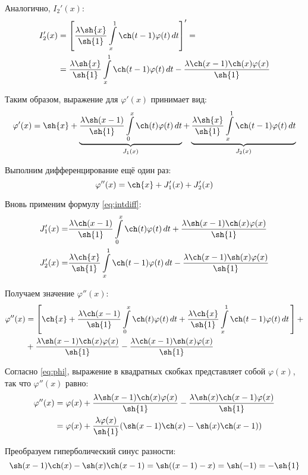 \documentclass{article}
\numberwithin{equation}{section}
\renewcommand{\phi}{\varphi}
\newcommand{\intl}{\int\limits}
\begin{document}
Аналогично, $I_2'(x)$:
\begin{align*}
  I_2'(x) &= \left[\frac{\lambda \sh{x}}{\sh{1}}\intl_x^1{\ch(t-1)\phi(t)\,dt} \right] ' = \\
  &= \frac{\lambda \sh{x}}{\sh{1}}\intl_x^1{\ch(t-1)\phi(t)\,dt} -
  \frac{\lambda \ch(x-1) \ch(x) \phi(x)}{\sh{1}}
\end{align*}

Таким образом, выражение для $\phi'(x)$ принимает вид:
\begin{equation}
  \label{eq:phidiff}
  \phi'(x) = \sh{x} +
  \underbrace{\frac{\lambda \sh(x-1)}{\sh{1}}\intl_0^x{\ch(t) \phi(t)\,dt}}_{J_1(x)} +
  \underbrace{\frac{\lambda \sh{x}}{\sh{1}}\intl_x^1{\ch(t-1)\phi(t)\,dt}}_{J_2(x)}
\end{equation}

Выполним дифференцирование ещё один раз:
\begin{equation*}
  \phi''(x) = \ch{x} + J_1'(x) + J_2'(x)
\end{equation*}

Вновь применим формулу \eqref{eq:intdiff}:
\begin{align*}
  J_1'(x) =& \frac{\lambda \ch(x-1)}{\sh{1}}\intl_0^x{\ch(t)\phi(t)\,dt} +
  \frac{\lambda \sh(x-1) \ch(x) \phi(x)}{\sh{1}} \\
  J_2'(x) =& \frac{\lambda \ch{x}}{\sh{1}}\intl_x^1{\ch(t-1)\phi(t)\,dt} -
  \frac{\lambda \ch(x-1) \sh(x) \phi(x)}{\sh{1}}
\end{align*}

Получаем значение $\phi''(x)$:
\begin{align*}
  \phi''(x) &= \left [ \ch{x} +
    \frac{\lambda \ch(x-1)}{\sh{1}}\intl_0^x{\ch(t)\phi(t)\,dt} +
    \frac{\lambda \ch{x}}{\sh{1}}\intl_x^1{\ch(t-1)\phi(t)\,dt}\, \right ] +\\
  &+ \frac{\lambda \sh(x-1) \ch(x) \phi(x)}{\sh{1}} -
  \frac{\lambda \ch(x-1) \sh(x) \phi(x)}{\sh{1}}
\end{align*}

Согласно \eqref{eq:phi}, выражение в квадратных скобках представляет
собой $\phi(x)$, так что $\phi''(x)$ равно:
\begin{align*}
  \phi''(x) &= \phi(x) + 
  \frac{\lambda \sh(x-1) \ch(x) \phi(x)}{\sh{1}} -
  \frac{\lambda \sh(x) \ch(x-1) \phi(x)}{\sh{1}} \\
  &= \phi(x) + \frac{\lambda \phi(x)}{\sh{1}}
  ( \sh(x-1) \ch(x) - \sh(x) \ch(x-1) )
\end{align*}

Преобразуем гиперболический синус разности:
\begin{equation*}
  \sh(x-1) \ch(x) - \sh(x) \ch(x-1) = \sh((x-1) - x) = \sh(-1) = -\sh{1}
\end{equation*}
\end{document}
